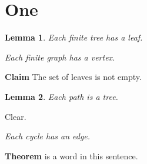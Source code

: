 \documentclass{article}
\newtheorem{lem}{Lemma}[section]
\newcommand{\claim}{{\noindent \bf Claim }}
\newcommand{\Thm}{\textbf{Theorem}}
\begin{document}
\section{One}
\begin{lem}\label{one} Each finite tree has a leaf. \end{lem}

\smallskip {} {\em Each finite graph has a vertex.}

\claim The set of leaves is not empty.
\begin{lem} Each path is a tree. \end{lem} \proof Clear.

 {\em Each cycle has an edge.}

\Thm{} is a word in this sentence.
\end{document}
